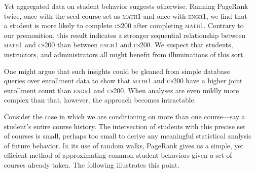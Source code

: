 Yet aggregated data on student behavior suggests otherwise. Running PageRank twice, once with the seed course set as \textsc{math1} and once with \textsc{engr1}, we find that a student is more likely to complete
\textsc{cs200} after completing \textsc{math1}. Contrary to our premonition, this result indicates a stronger sequential relationship
between \textsc{math1} and \textsc{cs200} than between \textsc{engr1} and \textsc{cs200}. We suspect that students, instructors, and administrators all might benefit from illuminations of this sort.

One might argue that such insights could be gleaned from simple
database queries over enrollment data to show that \textsc{math1} and \textsc{cs200} have a higher joint enrollment count than \textsc{engr1} and \textsc{cs200}. When analyses are even mildly more complex than that, however, the approach becomes intractable.

Consider the case in which we are conditioning on more than
one course---say a student's entire course history. The intersection
of students with this precise set of courses is small, perhaps too
small to derive any meaningful statistical analysis of future
behavior. In its use of random walks, PageRank gives us a simple, yet
efficient method of approximating common student behaviors given a set
of courses already taken. The following illustrates this point.

